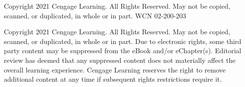 \documentclass[10pt]{article}
\begin{document}
\vfill
\begin{center}
{\fontsize{5.5}{6.5}\selectfont\color{black!60}
Copyright 2021 Cengage Learning. All Rights Reserved. May not be copied, scanned, or duplicated, in whole or in part. WCN 02-200-203\par\vspace{1pt}
Copyright 2021 Cengage Learning. All Rights Reserved. May not be copied, scanned, or duplicated, in whole or in part. Due to electronic rights, some third party content may be suppressed from the eBook and/or eChapter(s). Editorial review has deemed that any suppressed content does not materially affect the overall learning experience. Cengage Learning reserves the right to remove additional content at any time if subsequent rights restrictions require it.
}
\end{center}
\end{document}
